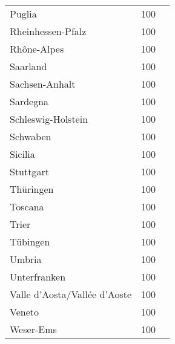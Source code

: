 \begin{table}[H]
\begin{tabularx}{\textwidth}{Xcc}
            Puglia & 100 \\
            Rheinhessen-Pfalz & 100 \\
            Rhône-Alpes & 100 \\
            Saarland & 100 \\
            Sachsen-Anhalt & 100 \\
            Sardegna & 100 \\
            Schleswig-Holstein & 100 \\
            Schwaben & 100 \\
            Sicilia & 100 \\
            Stuttgart & 100 \\
            Thüringen & 100 \\
            Toscana & 100 \\
            Trier & 100 \\
            Tübingen & 100 \\
            Umbria & 100 \\
            Unterfranken & 100 \\
            Valle d’Aosta/Vallée d’Aoste & 100 \\
            Veneto & 100 \\
            Weser-Ems & 100 \\
        \bottomrule
    \end{tabularx}
\end{table}
        